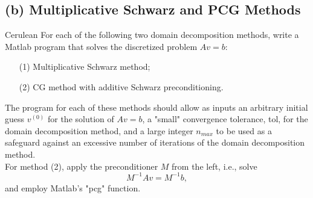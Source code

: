 \documentclass[12pt]{article}
\begin{document}
\subsection{(b) Multiplicative Schwarz and PCG Methods}\begin{mybox}{Cerulean}{}
For each of the following two domain decomposition methods, write a Matlab program that solves the discretized problem $Av = b$:
\begin{itemize}
\item[(1)] Multiplicative Schwarz method;
\item[(2)] CG method with additive Schwarz preconditioning.
\end{itemize}
The program for each of these methods should allow as inputs an arbitrary initial guess $v^{(0)}$ for the solution of $Av = b$, a "small" convergence tolerance, tol, for the domain decomposition method, and a large integer $n_{max}$ to be used as a safeguard against an excessive number of iterations of the domain decomposition method.\\
For method (2), apply the preconditioner $M$ from the left, i.e., solve
$$M^{-1}Av = M^{-1}b,$$
and employ Matlab's "pcg" function.\\
\end{mybox}\text{ }\\
\end{document}
